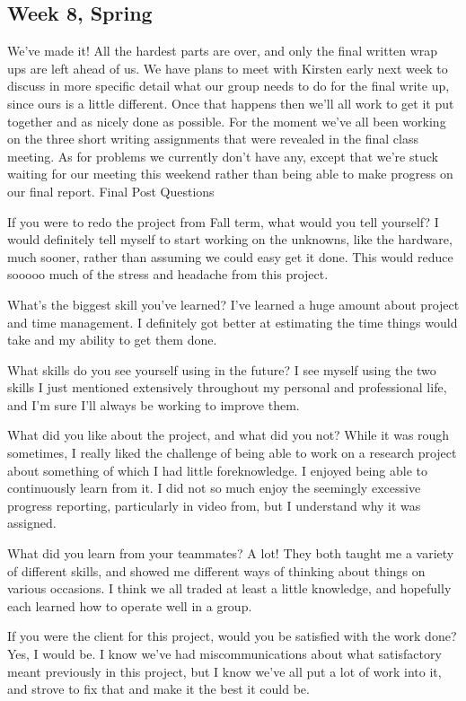 \documentclass[IEEEtran,letterpaper,10pt,notitlepage,draftclsnofoot,onecolumn]{article}
\begin{document}
\subsection{Week 8, Spring}
We've made it! All the hardest parts are over, and only the final written wrap ups are left ahead of us. We have plans to meet with Kirsten early next week to discuss in more specific detail what our group needs to do for the final write up, since ours is a little different. Once that happens then we'll all work to get it put together and as nicely done as possible. For the moment we've all been working on the three short writing assignments that were revealed in the final class meeting. As for problems we currently don't have any, except that we're stuck waiting for our meeting this weekend rather than being able to make progress on our final report.
Final Post Questions

If you were to redo the project from Fall term, what would you tell yourself? I would definitely tell myself to start working on the unknowns, like the hardware, much sooner, rather than assuming we could easy get it done. This would reduce sooooo much of the stress and headache from this project.

What's the biggest skill you've learned? I've learned a huge amount about project and time management. I definitely got better at estimating the time things would take and my ability to get them done.

What skills do you see yourself using in the future? I see myself using the two skills I just mentioned extensively throughout my personal and professional life, and I'm sure I'll always be working to improve them.

What did you like about the project, and what did you not? While it was rough sometimes, I really liked the challenge of being able to work on a research project about something of which I had little foreknowledge. I enjoyed being able to continuously learn from it. I did not so much enjoy the seemingly excessive progress reporting, particularly in video from, but I understand why it was assigned.

What did you learn from your teammates? A lot! They both taught me a variety of different skills, and showed me different ways of thinking about things on various occasions. I think we all traded at least a little knowledge, and hopefully each learned how to operate well in a group.

If you were the client for this project, would you be satisfied with the work done? Yes, I would be. I know we've had miscommunications about what satisfactory meant previously in this project, but I know we've all put a lot of work into it, and strove to fix that and make it the best it could be.
\end{document}
